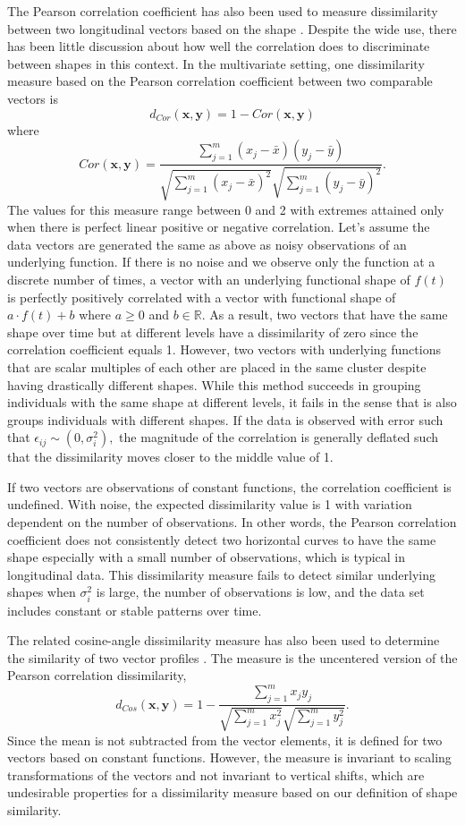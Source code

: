 \documentclass[12pt]{article}
\newcommand{\B}[0]{\mathbf}
\begin{document}
The Pearson correlation coefficient has also been used to measure dissimilarity between two longitudinal vectors based on the shape \cite{chouakria2007, eisen1998, chiou2008}. Despite the wide use, there has been little discussion about how well the correlation does to discriminate between shapes in this context. In the multivariate setting, one dissimilarity measure based on the Pearson correlation coefficient between two comparable vectors is 
$$d_{Cor}(\B x,\B y) = 1-Cor(\B x,\B y)$$ 
where $$Cor(\B x,\B y) = \frac{\sum^{m}_{j=1}(x_{j}-\bar{x})(y_{j}-\bar{y})}{\sqrt{\sum^{m}_{j=1}(x_{j}-\bar{x})^{2}}\sqrt{\sum^{m}_{j=1}(y_{j}-\bar{y})^{2}}}.$$
The values for this measure range between 0 and 2 with extremes attained only when there is perfect linear positive or negative correlation. Let's assume the data vectors are generated the same as above as noisy observations of an underlying function. If there is no noise and we observe only the function at a discrete number of times, a vector with an underlying functional shape of $f(t)$ is perfectly positively correlated with a vector with functional shape of $a\cdot f(t) + b$ where $a\geq0$ and $b\in\mathbb{R}$. As a result, two vectors that have the same shape over time but at different levels have a dissimilarity of zero since the correlation coefficient equals 1. However, two vectors with underlying functions that are scalar multiples of each other are placed in the same cluster despite having drastically different shapes. While this method succeeds in grouping individuals with the same shape at different levels, it fails in the sense that is also groups individuals with different shapes. If the data is observed with error such that $\epsilon_{ij}\sim(0,\sigma_{i}^{2}),$ the magnitude of the correlation is generally deflated such that the dissimilarity moves closer to the middle value of 1.

If two vectors are observations of constant functions, the correlation coefficient is undefined. With noise, the expected dissimilarity value is 1 with variation dependent on the number of observations. In other words, the Pearson correlation coefficient does not consistently detect two horizontal curves to have the same shape especially with a small number of observations, which is typical in longitudinal data. This dissimilarity measure fails to detect similar underlying shapes when $\sigma_{i}^{2}$ is large, the number of observations is low, and the data set includes constant or stable patterns over time. 

The related cosine-angle dissimilarity measure has also been used to determine the similarity of two vector profiles \cite{eisen1998}. The measure is the uncentered version of the Pearson correlation dissimilarity,
$$d_{Cos}(\B x,\B y) = 1- \frac{\sum^{m}_{j=1}x_{j}y_{j}}{\sqrt{\sum^{m}_{j=1}x_{j}^{2}}\sqrt{\sum^{m}_{j=1}y_{j}^{2}}}.$$
Since the mean is not subtracted from the vector elements, it is defined for two vectors based on constant functions. However, the measure is invariant to scaling transformations of the vectors and not invariant to vertical shifts, which are undesirable properties for a dissimilarity measure based on our definition of shape similarity. 
\end{document}
